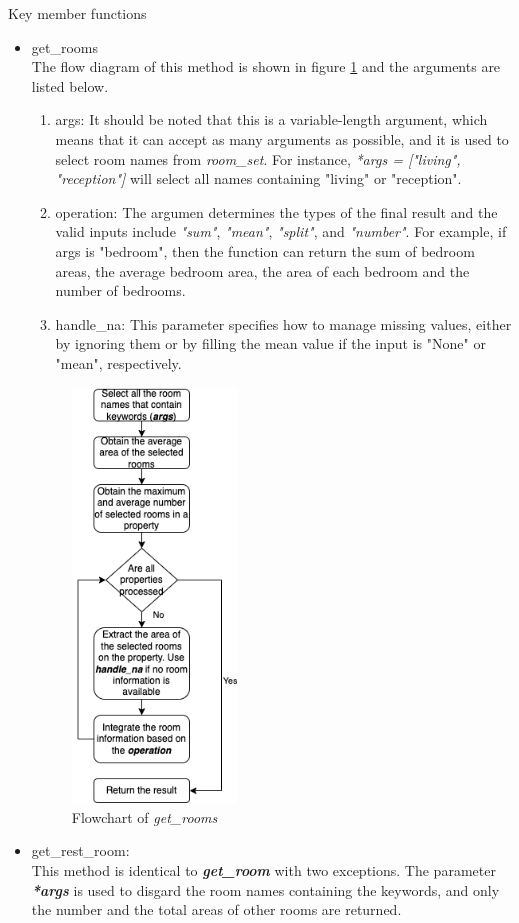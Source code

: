 \documentclass[12pt,twoside]{report}
\begin{document}
Key member functions
\begin{itemize}
	\item get\_rooms \\
	The flow diagram of this method is shown in figure \ref{extract_room_get_rooms} and the arguments are listed below.
	\begin{enumerate}
		\item args: It should be noted that this is a variable-length argument, which means that it can accept as many arguments as possible, and it is used to select room names from \textit{room\_set}. For instance, \textit{*args = ["living", "reception"]} will select all names containing "living" or "reception". 
		\item operation: The argumen determines the types of the final result and the valid inputs include \textit{"sum"}, \textit{"mean"}, \textit{"split"}, and \textit{"number"}. For example, if args is "bedroom", then the function can return the sum of bedroom areas, the average bedroom area, the area of each bedroom and the number of bedrooms. 
		\item handle\_na: This parameter specifies how to manage missing values, either by ignoring them or by filling the mean value if the input is "None" or "mean", respectively. 
	\end{enumerate} 
	\begin{figure}[h]
		\centering
		\includegraphics[height=11cm]{extract_room_get_rooms}
		\caption{Flowchart of \textit{get\_rooms}}
		\label{extract_room_get_rooms}
	\end{figure}
	\item get\_rest\_room: \\
	This method is identical to \textit{\textbf{get\_room}} with two exceptions. The parameter \textit{\textbf{*args}} is used to disgard the room names containing the keywords, and only the number and the total areas of other rooms are returned. 
\end{itemize}
\end{document}
